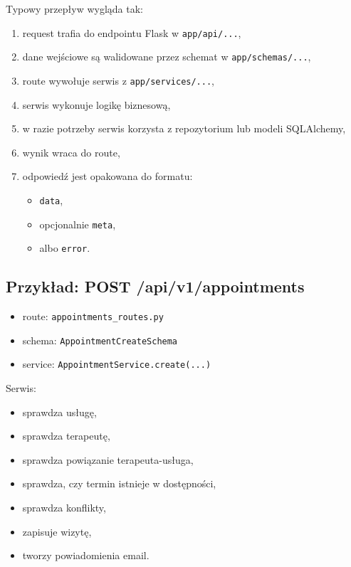 \documentclass[11pt,a4paper]{article}
\begin{document}
Typowy przepływ wygląda tak:
\begin{enumerate}[leftmargin=1.2cm]
    \item request trafia do endpointu Flask w \texttt{app/api/...},
    \item dane wejściowe są walidowane przez schemat w \texttt{app/schemas/...},
    \item route wywołuje serwis z \texttt{app/services/...},
    \item serwis wykonuje logikę biznesową,
    \item w razie potrzeby serwis korzysta z repozytorium lub modeli SQLAlchemy,
    \item wynik wraca do route,
    \item odpowiedź jest opakowana do formatu:
    \begin{itemize}
        \item \texttt{data},
        \item opcjonalnie \texttt{meta},
        \item albo \texttt{error}.
    \end{itemize}
\end{enumerate}

\subsection{Przykład: POST /api/v1/appointments}

\begin{itemize}[leftmargin=1.2cm]
    \item route: \texttt{appointments\_routes.py}
    \item schema: \texttt{AppointmentCreateSchema}
    \item service: \texttt{AppointmentService.create(...)}
\end{itemize}

Serwis:
\begin{itemize}[leftmargin=1.2cm]
    \item sprawdza usługę,
    \item sprawdza terapeutę,
    \item sprawdza powiązanie terapeuta-usługa,
    \item sprawdza, czy termin istnieje w dostępności,
    \item sprawdza konflikty,
    \item zapisuje wizytę,
    \item tworzy powiadomienia email.
\end{itemize}
\end{document}
